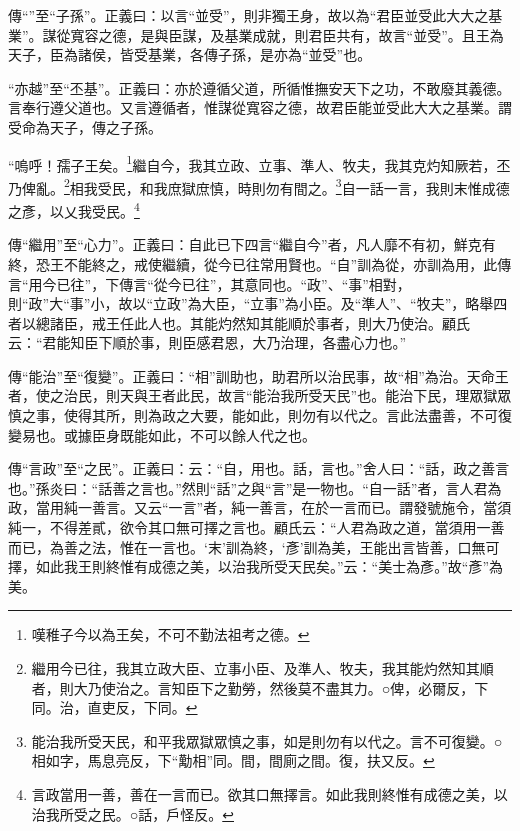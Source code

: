 {\noindent\zhuan{}\fzbyks 傳“”至“子孫”。正義曰：以言“並受”，則非獨王身，故以為“君臣並受此大大之基業”。謀從寬容之德，是與臣謀，及基業成就，則君臣共有，故言“並受”。且王為天子，臣為諸侯，皆受基業，各傳子孫，是亦為“並受”也。 \par}

{\noindent\shu{}\fzkt “亦越”至“丕基”。正義曰：亦於遵循父道，所循惟撫安天下之功，不敢廢其義德。言奉行遵父道也。又言遵循者，惟謀從寬容之德，故君臣能並受此大大之基業。謂受命為天子，傳之子孫。 \par}

“嗚呼！孺子王矣。\footnote{嘆稚子今以為王矣，不可不勤法祖考之德。}繼自今，我其立政、立事、準人、牧夫，我其克灼知厥若，丕乃俾亂。\footnote{繼用今已往，我其立政大臣、立事小臣、及準人、牧夫，我其能灼然知其順者，則大乃使治之。言知臣下之勤勞，然後莫不盡其力。○俾，必爾反，下同。治，直吏反，下同。}相我受民，和我庶獄庶慎，時則勿有間之。\footnote{能治我所受天民，和平我眾獄眾慎之事，如是則勿有以代之。言不可復變。○相如字，馬息亮反，下“勱相”同。間，間廁之間。復，扶又反。}自一話一言，我則末惟成德之彥，以乂我受民。\footnote{言政當用一善，善在一言而已。欲其口無擇言。如此我則終惟有成德之美，以治我所受之民。○話，戶怪反。}


{\noindent\zhuan{}\fzbyks 傳“繼用”至“心力”。正義曰：自此已下四言“繼自今”者，凡人靡不有初，鮮克有終，恐王不能終之，戒使繼續，從今已往常用賢也。“自”訓為從，亦訓為用，此傳言“用今已往”，下傳言“從今已往”，其意同也。“政”、“事”相對，則“政”大“事”小，故以“立政”為大臣，“立事”為小臣。及“準人”、“牧夫”，略舉四者以總諸臣，戒王任此人也。其能灼然知其能順於事者，則大乃使治。顧氏云：“君能知臣下順於事，則臣感君恩，大乃治理，各盡心力也。” \par}

{\noindent\zhuan{}\fzbyks 傳“能治”至“復變”。正義曰：“相”訓助也，助君所以治民事，故“相”為治。天命王者，使之治民，則天與王者此民，故言“能治我所受天民”也。能治下民，理眾獄眾慎之事，使得其所，則為政之大要，能如此，則勿有以代之。言此法盡善，不可復變易也。或據臣身既能如此，不可以餘人代之也。 \par}

{\noindent\zhuan{}\fzbyks 傳“言政”至“之民”。正義曰：云：“自，用也。話，言也。”舍人曰：“話，政之善言也。”孫炎曰：“話善之言也。”然則“話”之與“言”是一物也。“自一話”者，言人君為政，當用純一善言。又云“一言”者，純一善言，在於一言而已。謂發號施令，當須純一，不得差貳，欲令其口無可擇之言也。顧氏云：“人君為政之道，當須用一善而已，為善之法，惟在一言也。‘末’訓為終，‘彥’訓為美，王能出言皆善，口無可擇，如此我王則終惟有成德之美，以治我所受天民矣。”云：“美士為彥。”故“彥”為美。 \par}

